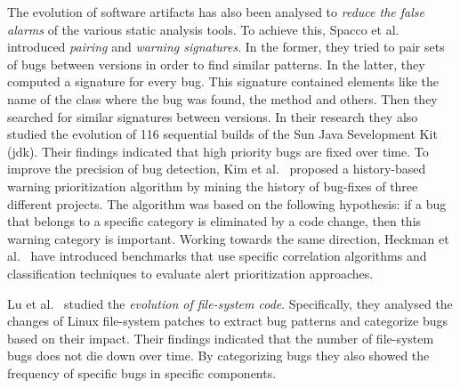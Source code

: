 \documentclass[conference]{llncs}
\begin{document}
The evolution of software artifacts has also been analysed to {\it reduce the false
alarms} of the various static analysis tools. To achieve this, Spacco et
al.~\cite{SHP06} introduced {\it pairing} and {\it warning signatures}. In the
former, they tried to pair sets of bugs between versions in order to find
similar patterns. In the latter, they computed a signature for every bug. This
signature contained elements like the name of the class where the bug was found,
the method and others. Then they searched for similar signatures between
versions. In their research they also studied the evolution of 116 sequential
builds of the Sun Java Sevelopment Kit ({\sc jdk}). Their findings indicated that
high priority bugs are fixed over time. To improve the precision of bug
detection, Kim et al.~\cite{KE07b}\cite{KE07} proposed a history-based warning
prioritization algorithm by mining the history of bug-fixes of three
different projects. The algorithm was based on the following hypothesis: if a
bug that belongs to a specific category is eliminated by a code change, then
this warning category is important. Working towards the same direction, Heckman
et al.~\cite{HW09}\cite{HW08} have introduced benchmarks that use specific
correlation algorithms and classification techniques to evaluate alert
prioritization approaches.

Lu et al.~\cite{LAAL13} studied the {\it evolution of file-system code}.
Specifically, they analysed the changes of Linux file-system patches to extract
bug patterns and categorize bugs based on their impact. Their findings
indicated that the number of file-system bugs does not die down over time. By
categorizing bugs they also showed the frequency of specific bugs in specific
components.
\end{document}
